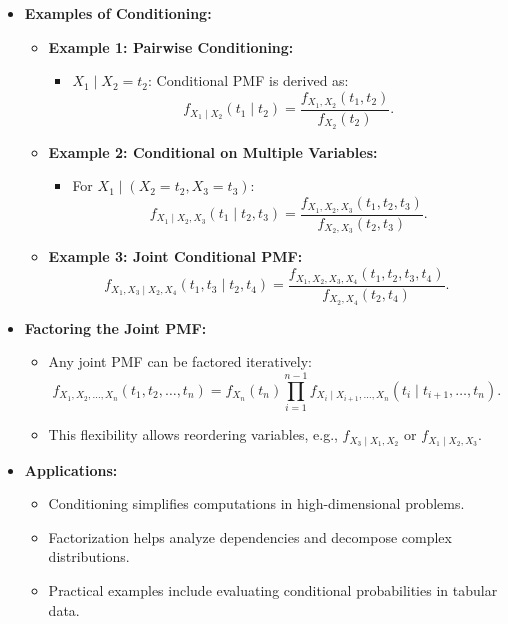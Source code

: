 \documentclass{article}
\begin{document}
\begin{itemize}
  \item \textbf{Examples of Conditioning:}
    \begin{itemize}
      \item \textbf{Example 1: Pairwise Conditioning:}
        \begin{itemize}
          \item $X_1 \mid X_2 = t_2$: Conditional PMF is derived as:
            \[
              f_{X_1 \mid X_2}(t_1 \mid t_2) = \frac{f_{X_1, X_2}(t_1, t_2)}{f_{X_2}(t_2)}.
            \]
        \end{itemize}
      \item \textbf{Example 2: Conditional on Multiple Variables:}
        \begin{itemize}
          \item For $X_1 \mid (X_2 = t_2, X_3 = t_3)$:
            \[
              f_{X_1 \mid X_2, X_3}(t_1 \mid t_2, t_3) = \frac{f_{X_1, X_2, X_3}(t_1, t_2, t_3)}{f_{X_2, X_3}(t_2, t_3)}.
            \]
        \end{itemize}
      \item \textbf{Example 3: Joint Conditional PMF:}
        \[
          f_{X_1, X_3 \mid X_2, X_4}(t_1, t_3 \mid t_2, t_4) = \frac{f_{X_1, X_2, X_3, X_4}(t_1, t_2, t_3, t_4)}{f_{X_2, X_4}(t_2, t_4)}.
        \]
    \end{itemize}

  \item \textbf{Factoring the Joint PMF:}
    \begin{itemize}
      \item Any joint PMF can be factored iteratively:
        \[
          f_{X_1, X_2, \dots, X_n}(t_1, t_2, \dots, t_n) = f_{X_n}(t_n) \prod_{i=1}^{n-1} f_{X_i \mid X_{i+1}, \dots, X_n}(t_i \mid t_{i+1}, \dots, t_n).
        \]
      \item This flexibility allows reordering variables, e.g., $f_{X_3 \mid X_1, X_2}$ or $f_{X_1 \mid X_2, X_3}$.
    \end{itemize}

  \item \textbf{Applications:}
    \begin{itemize}
      \item Conditioning simplifies computations in high-dimensional problems.
      \item Factorization helps analyze dependencies and decompose complex distributions.
      \item Practical examples include evaluating conditional probabilities in tabular data.
    \end{itemize}
\end{itemize}
\end{document}

